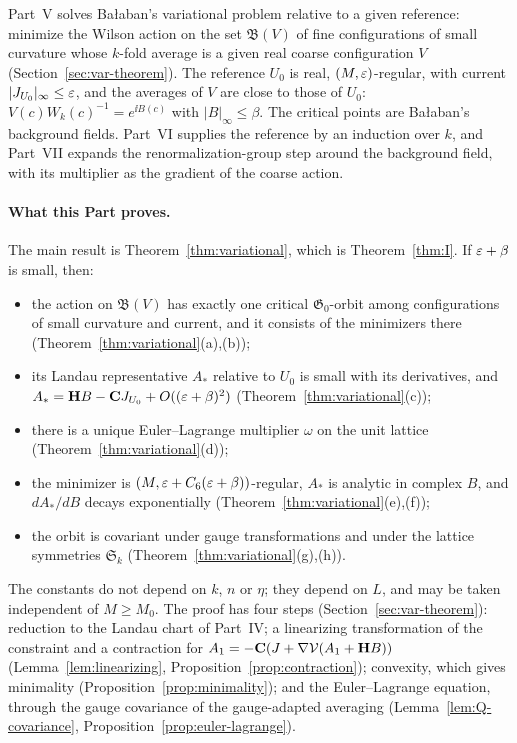 \label{intro:V}
Part~V solves Ba\l aban's variational problem relative to a given reference: minimize the Wilson action on the set $\mathfrak B(V)$ of fine configurations of small curvature whose $k$-fold average is a given real coarse configuration $V$ (Section~\ref{sec:var-theorem}). The reference $U_0$ is real, $(M,\varepsilon)$-regular, with current $|J_{U_0}|_\infty\le\varepsilon$, and the averages of $V$ are close to those of $U_0$: $V(c)W_k(c)^{-1}=e^{\ii B(c)}$ with $|B|_\infty\le\beta$. The critical points are Ba\l aban's background fields. Part~VI supplies the reference by an induction over $k$, and Part~VII expands the renormalization-group step around the background field, with its multiplier as the gradient of the coarse action.

\paragraph{What this Part proves.} The main result is Theorem~\ref{thm:variational}, which is Theorem~\ref{thm:I}. If $\varepsilon+\beta$ is small, then:
\begin{itemize}
\item the action on $\mathfrak B(V)$ has exactly one critical $\mathfrak G_0$-orbit among configurations of small curvature and current, and it consists of the minimizers there (Theorem~\ref{thm:variational}(a),(b));
\item its Landau representative $A_*$ relative to $U_0$ is small with its derivatives, and $A_*=\mathbf H B-\mathbf C J_{U_0}+O((\varepsilon+\beta)^2)$ (Theorem~\ref{thm:variational}(c));
\item there is a unique Euler--Lagrange multiplier $\omega$ on the unit lattice (Theorem~\ref{thm:variational}(d));
\item the minimizer is $(M,\varepsilon+C_6(\varepsilon+\beta))$-regular, $A_*$ is analytic in complex $B$, and $dA_*/dB$ decays exponentially (Theorem~\ref{thm:variational}(e),(f));
\item the orbit is covariant under gauge transformations and under the lattice symmetries $\mathfrak S_k$ (Theorem~\ref{thm:variational}(g),(h)).
\end{itemize}
The constants do not depend on $k$, $n$ or $\eta$; they depend on $L$, and may be taken independent of $M\ge M_0$. The proof has four steps (Section~\ref{sec:var-theorem}): reduction to the Landau chart of Part~IV; a linearizing transformation of the constraint and a contraction for $A_1=-\mathbf C(J+\nabla\mathcal V(A_1+\mathbf H B))$ (Lemma~\ref{lem:linearizing}, Proposition~\ref{prop:contraction}); convexity, which gives minimality (Proposition~\ref{prop:minimality}); and the Euler--Lagrange equation, through the gauge covariance of the gauge-adapted averaging (Lemma~\ref{lem:Q-covariance}, Proposition~\ref{prop:euler-lagrange}).

